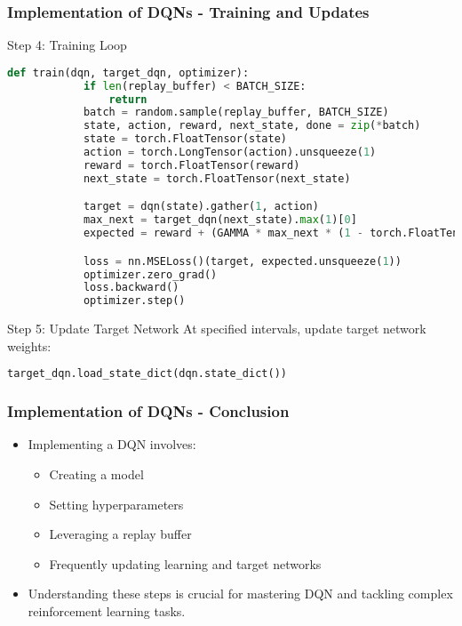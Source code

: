 \documentclass[aspectratio=169]{beamer}
\begin{document}
\begin{frame}[fragile]
    \frametitle{Implementation of DQNs - Training and Updates}
    \begin{block}{Step 4: Training Loop}
        \begin{lstlisting}[language=python]
        def train(dqn, target_dqn, optimizer):
            if len(replay_buffer) < BATCH_SIZE:
                return
            batch = random.sample(replay_buffer, BATCH_SIZE)
            state, action, reward, next_state, done = zip(*batch)
            state = torch.FloatTensor(state)
            action = torch.LongTensor(action).unsqueeze(1)
            reward = torch.FloatTensor(reward)
            next_state = torch.FloatTensor(next_state)

            target = dqn(state).gather(1, action)
            max_next = target_dqn(next_state).max(1)[0]
            expected = reward + (GAMMA * max_next * (1 - torch.FloatTensor(done)))

            loss = nn.MSELoss()(target, expected.unsqueeze(1))
            optimizer.zero_grad()
            loss.backward()
            optimizer.step()
        \end{lstlisting}
    \end{block}

    \begin{block}{Step 5: Update Target Network}
        At specified intervals, update target network weights:
        \begin{lstlisting}[language=python]
        target_dqn.load_state_dict(dqn.state_dict())
        \end{lstlisting}
    \end{block}
\end{frame}

\begin{frame}
    \frametitle{Implementation of DQNs - Conclusion}
    \begin{itemize}
        \item Implementing a DQN involves:
        \begin{itemize}
            \item Creating a model
            \item Setting hyperparameters
            \item Leveraging a replay buffer
            \item Frequently updating learning and target networks
        \end{itemize}
        \item Understanding these steps is crucial for mastering DQN and tackling complex reinforcement learning tasks.
    \end{itemize}
\end{frame}
\end{document}

